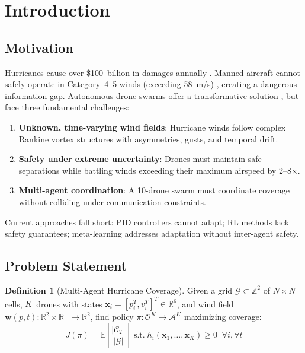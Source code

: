 \documentclass[11pt,twocolumn]{article}
\theoremstyle{definition}
\newtheorem{definition}[theorem]{Definition}
\newcommand{\R}{\mathbb{R}}
\newcommand{\EE}{\mathbb{E}}
\newcommand{\cA}{\mathcal{A}}
\newcommand{\cG}{\mathcal{G}}
\newcommand{\cC}{\mathcal{C}}
\newcommand{\cO}{\mathcal{O}}
\newcommand{\vect}[1]{\mathbf{#1}}
\begin{document}
\section{Introduction}
\label{sec:introduction}

\subsection{Motivation}
Hurricanes cause over \$100~billion in damages annually \citep{NOAA2023}. Manned aircraft cannot safely operate in Category~4--5 winds (exceeding 58~m/s) \citep{NOAAHurricane2020}, creating a dangerous information gap. Autonomous drone swarms offer a transformative solution \citep{Prudden2018,Fisher2016}, but face three fundamental challenges:

\begin{enumerate}[leftmargin=*]
    \item \textbf{Unknown, time-varying wind fields}: Hurricane winds follow complex Rankine vortex structures with asymmetries, gusts, and temporal drift.
    \item \textbf{Safety under extreme uncertainty}: Drones must maintain safe separations while battling winds exceeding their maximum airspeed by 2--8$\times$.
    \item \textbf{Multi-agent coordination}: A 10-drone swarm must coordinate coverage without colliding under communication constraints.
\end{enumerate}

Current approaches fall short: PID controllers \citep{Duggal2020} cannot adapt; RL methods \citep{PPO2017} lack safety guarantees; meta-learning \citep{NeuralFly2022} addresses adaptation without inter-agent safety.

\subsection{Problem Statement}

\begin{definition}[Multi-Agent Hurricane Coverage]
\label{def:coverage}
Given a grid $\cG \subset \mathbb{Z}^2$ of $N \!\times\! N$ cells, $K$~drones with states $\vect{x}_i = [p_i^T, v_i^T]^T \in \R^6$, and wind field $\vect{w}(p,t): \R^2 \times \R_+ \to \R^2$, find policy $\pi: \cO^K \to \cA^K$ maximizing coverage:
\[
    J(\pi) = \EE\left[\frac{|\cC_T|}{|\cG|}\right] \;\text{s.t.}\; h_i(\vect{x}_1, \ldots, \vect{x}_K) \geq 0 \;\; \forall i, \forall t
\]
\end{definition}
\end{document}
